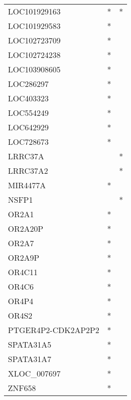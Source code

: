 \begin{tabular}{lcc}
LOC101929163       &  * &       * \\
LOC101929583       &  * &         \\
LOC102723709       &  * &         \\
LOC102724238       &  * &         \\
LOC103908605       &  * &         \\
LOC286297          &  * &         \\
LOC403323          &  * &         \\
LOC554249          &  * &         \\
LOC642929          &  * &         \\
LOC728673          &  * &         \\
LRRC37A            &    &       * \\
LRRC37A2           &    &       * \\
MIR4477A           &  * &         \\
NSFP1              &    &       * \\
OR2A1              &  * &         \\
OR2A20P            &  * &         \\
OR2A7              &  * &         \\
OR2A9P             &  * &         \\
OR4C11             &  * &         \\
OR4C6              &  * &         \\
OR4P4              &  * &         \\
OR4S2              &  * &         \\
PTGER4P2-CDK2AP2P2 &  * &         \\
SPATA31A5          &  * &         \\
SPATA31A7          &  * &         \\
XLOC\_007697        &  * &         \\
ZNF658             &  * &         \\
\bottomrule
\end{tabular}
